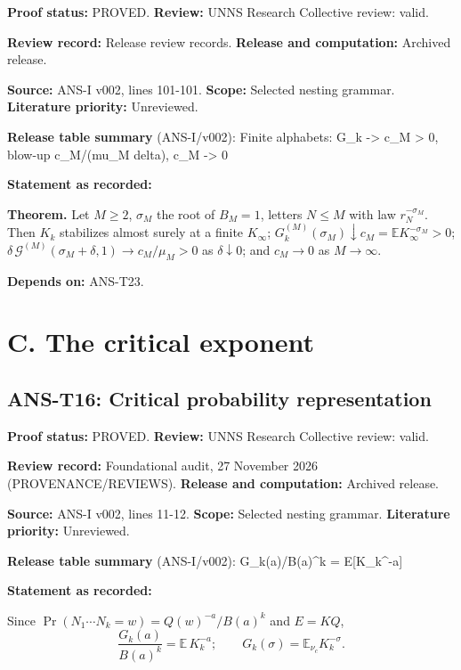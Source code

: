 \documentclass[
  11pt,
]{article}
\begin{document}
\textbf{Proof status:} PROVED. \textbf{Review:} UNNS Research Collective
review: valid.

\textbf{Review record:} Release review records. \textbf{Release and
computation:} Archived release.

\textbf{Source:} ANS-I v002, lines 101-101. \textbf{Scope:} Selected
nesting grammar. \textbf{Literature priority:} Unreviewed.

\textbf{Release table summary} (ANS-I/v002): Finite alphabets: G\_k
-\textgreater{} c\_M \textgreater{} 0, blow-up c\_M/(mu\_M delta), c\_M
-\textgreater{} 0

\textbf{Statement as recorded:}

\textbf{Theorem.} Let \(M\ge2\), \(\sigma_M\) the root of \(B_M=1\),
letters \(N\le M\) with law \(r_N^{-\sigma_M}\). Then \(K_k\) stabilizes
almost surely at a finite \(K_\infty\);
\(G^{(M)}_k(\sigma_M)\downarrow c_M=\mathbb EK_\infty^{-\sigma_M}>0\);
\(\delta\,\mathcal G^{(M)}(\sigma_M+\delta,1)\to c_M/\mu_M>0\) as
\(\delta\downarrow0\); and \(c_M\to0\) as \(M\to\infty\).

\textbf{Depends on:} ANS-T23.

\hypertarget{c.-the-critical-exponent}{%
\section{C. The critical exponent}\label{c.-the-critical-exponent}}

\hypertarget{ans-t16-critical-probability-representation}{%
\subsection{ANS-T16: Critical probability
representation}\label{ans-t16-critical-probability-representation}}

\textbf{Proof status:} PROVED. \textbf{Review:} UNNS Research Collective
review: valid.

\textbf{Review record:} Foundational audit, 27 November 2026
(PROVENANCE/REVIEWS). \textbf{Release and computation:} Archived
release.

\textbf{Source:} ANS-I v002, lines 11-12. \textbf{Scope:} Selected
nesting grammar. \textbf{Literature priority:} Unreviewed.

\textbf{Release table summary} (ANS-I/v002): G\_k(a)/B(a)\^{}k =
E{[}K\_k\^{}-a{]}

\textbf{Statement as recorded:}

Since \(\Pr(N_1\cdots N_k=w)=Q(w)^{-a}/B(a)^k\) and \(E=KQ\),
\[\frac{G_k(a)}{B(a)^k}=\mathbb E\,K_k^{-a};\qquad G_k(\sigma)=\mathbb E_{\nu_c}K_k^{-\sigma}.\]
\end{document}

